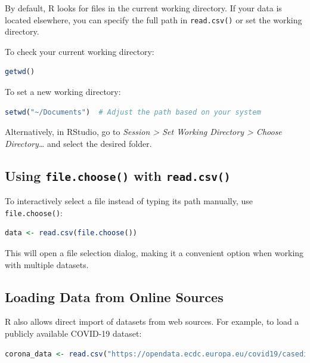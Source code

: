 \documentclass[
]{book}
\newcommand{\passthrough}[1]{#1}
\theoremstyle{definition}
\theoremstyle{definition}
\theoremstyle{definition}
\theoremstyle{definition}
\theoremstyle{remark}
\begin{document}
By default, R looks for files in the current working directory. If your data is located elsewhere, you can specify the full path in \passthrough{\lstinline!read.csv()!} or set the working directory.

To check your current working directory:

\begin{lstlisting}[language=R]
getwd()
\end{lstlisting}

To set a new working directory:

\begin{lstlisting}[language=R]
setwd("~/Documents")  # Adjust the path based on your system
\end{lstlisting}

Alternatively, in RStudio, go to \emph{Session \textgreater{} Set Working Directory \textgreater{} Choose Directory\ldots{}} and select the desired folder.

\subsection*{\texorpdfstring{Using \texttt{file.choose()} with \texttt{read.csv()}}{Using file.choose() with read.csv()}}\label{using-file.choose-with-read.csv}

To interactively select a file instead of typing its path manually, use \passthrough{\lstinline!file.choose()!}:

\begin{lstlisting}[language=R]
data <- read.csv(file.choose())
\end{lstlisting}

This will open a file selection dialog, making it a convenient option when working with multiple datasets.

\subsection*{Loading Data from Online Sources}\label{loading-data-from-online-sources}

R also allows direct import of datasets from web sources. For example, to load a publicly available COVID-19 dataset:

\begin{lstlisting}[language=R]
corona_data <- read.csv("https://opendata.ecdc.europa.eu/covid19/casedistribution/csv", na.strings = "", fileEncoding = "UTF-8-BOM")
\end{lstlisting}
\end{document}
